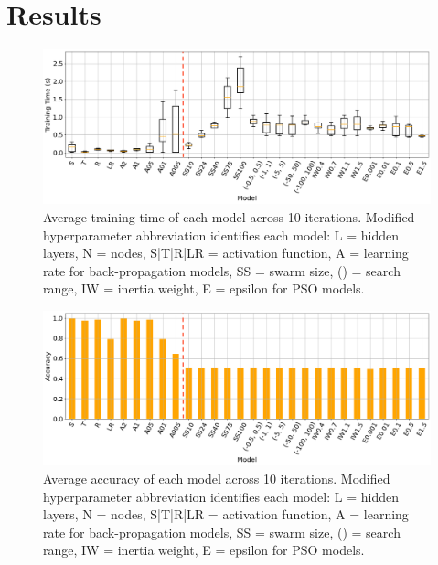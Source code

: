 \documentclass[12pt]{article}
\begin{document}
\vspace{-1.5em}
\section{Results}
\vspace{-1.5em}


\begin{figure}[H]
  \centering
  \includegraphics[width=1\textwidth]{figs/combo_ttime.png}
  \caption{
    Average training time of each model across 10 iterations.
    Modified hyperparameter abbreviation identifies each model:
    L = hidden layers, N = nodes, S|T|R|LR = activation function,
    A = learning rate for back-propagation models, SS = swarm size, () = search range, IW = inertia weight, E = epsilon for PSO models.
  }
  \label{fig:ttime}
\end{figure}

\begin{figure}[H]
  \centering
  \includegraphics[width=1\textwidth]{figs/combo_acc.png}
  \caption{
    Average accuracy of each model across 10 iterations.
    Modified hyperparameter abbreviation identifies each model:
    L = hidden layers, N = nodes, S|T|R|LR = activation function,
    A = learning rate for back-propagation models, SS = swarm size, () = search range, IW = inertia weight, E = epsilon for PSO models.
  }
  \label{fig:accuracy}
\end{figure}
\end{document}

